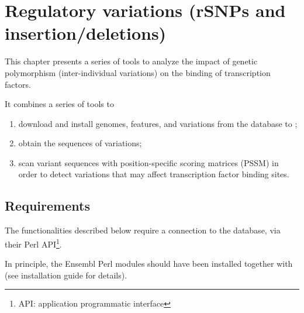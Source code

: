

\chapter{Regulatory variations (rSNPs and insertion/deletions)}



This chapter presents a series of tools to analyze the impact of
genetic polymorphism (inter-individual variations) on the binding of
transcription factors.

It combines a series of tools to 
\begin{enumerate}
\item download and install genomes, features, and variations from the
  \ensembl database to \RSAT;
\item obtain the sequences of variations;
\item scan variant sequences with position-specific scoring matrices
  (PSSM) in order to detect variations that may affect transcription
  factor binding sites.
\end{enumerate}

\section{Requirements}

The functionalities described below require a connection to the
\ensembl database, via their Perl API\footnote{API: application
  programmatic interface}. 

In principle, the Ensembl Perl modules should have been installed
together with \RSAT (see \RSAT installation guide for details).




